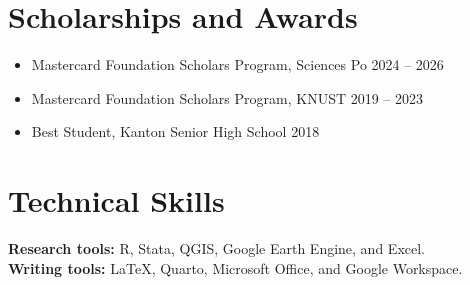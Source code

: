 \documentclass[11pt,a4paper]{article}
\begin{document}
\section*{Scholarships and Awards}
\begin{itemize}
  \item Mastercard Foundation Scholars Program, Sciences Po \hfill 2024 -- 2026
  \item Mastercard Foundation Scholars Program, KNUST \hfill 2019 -- 2023
  \item Best Student, Kanton Senior High School \hfill 2018
\end{itemize}

\section*{Technical Skills}
\textbf{Research tools:} R, Stata, QGIS, Google Earth Engine, and Excel.\\
\textbf{Writing tools:} LaTeX, Quarto, Microsoft Office, and Google Workspace.
\end{document}
